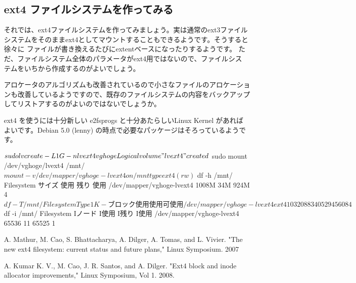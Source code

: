 \documentclass[mingoth,a4paper]{jsarticle}
\begin{document}
\subsection{ext4 ファイルシステムを作ってみる}

それでは、ext4ファイルシステムを作ってみましょう。実は通常のext3ファイル
システムをそのままext4としてマウントすることもできるようです。そうすると徐々に
ファイルが書き換えるたびにextentベースになったりするようです。
ただ、ファイルシステム全体のパラメータがext4用ではないので、ファイルシス
テムをいちから作成するのがよいでしょう。

アロケータのアルゴリズムも改善されているので小さなファイルのアロケーショ
ンも改善しているようですので、既存のファイルシステムの内容をバックアップ
してリストアするのがよいのではないでしょうか。

ext4 を使うには十分新しい e2fsprogs と十分あたらしいLinux Kernel があれば
よいです。Debian 5.0 (lenny) の時点で必要なパッケージはそろっているようです。

\begin{commandline}
 $ sudo lvcreate -L 1G -n lvext4 vghoge
  Logical volume "lvext4" created
 $ sudo mount /dev/vghoge/lvext4 /mnt/
 $ mount -v 
 /dev/mapper/vghoge-lvext4 on /mnt type ext4 (rw)
 $ df -h /mnt/
 Filesystem          サイズ  使用  残り 使用%
 /dev/mapper/vghoge-lvext4
                     1008M   34M  924M   4%
 $ df -T /mnt/ 
 Filesystem    Type   1K-ブロック    使用   使用可 使用%
 /dev/mapper/vghoge-lvext4
              ext4     1032088     34052    945608   4%
 $ df -i /mnt/
 Filesystem            Iノード  I使用   I残り I使用%
 /dev/mapper/vghoge-lvext4
                       65536      11   65525    1%
\end{commandline}

\begin{thebibliography}{0}
  A. Mathur, M. Cao, S. Bhattacharya, A. Dilger, A. Tomas, and
 L. Vivier. "The new ext4 filesystem: current status and future plans,"
 Linux Symposium. 2007

   A. Kumar K. V., M. Cao, J. R. Santos, and A. Dilger. "Ext4 block and inode allocator improvements," Linux Symposium, Vol 1. 2008.

\end{thebibliography}

\end{document}
